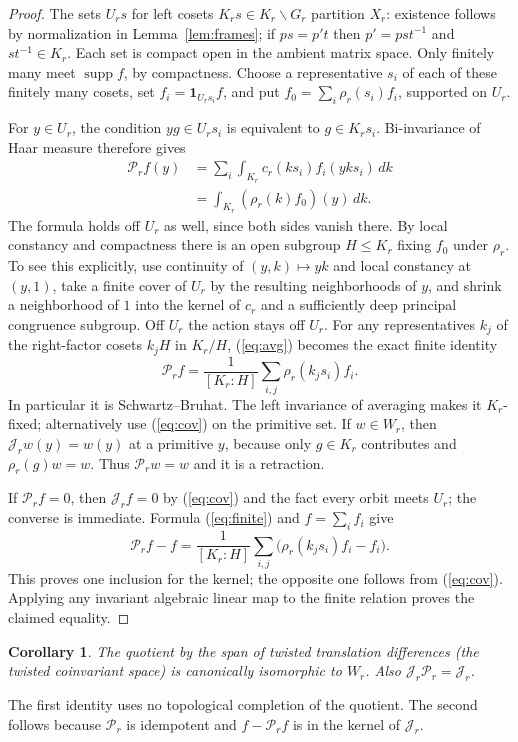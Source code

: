 \documentclass[11pt]{article}
\newtheorem{corollary}[theorem]{Corollary}
\theoremstyle{remark}\newtheorem{remark}[theorem]{Remark}
\newcommand{\Orb}{\mathcal J}
\newcommand{\Prj}{\mathcal P}
\newcommand{\one}{\mathbf 1}
\newcommand{\supp}{\operatorname{supp}}
\begin{document}
\begin{proof}
The sets $U_r s$ for left cosets $K_rs\in K_r\backslash G_r$ partition $X_r$: existence follows by normalization in Lemma~\ref{lem:frames}; if $p s=p't$ then $p'=p st^{-1}$ and $st^{-1}\in K_r$. Each set is compact open in the ambient matrix space. Only finitely many meet $\supp f$, by compactness. Choose a representative $s_i$ of each of these finitely many cosets, set $f_i=\one_{U_r s_i}f$, and put $f_0=\sum_i\rho_r(s_i)f_i$, supported on $U_r$.

For $y\in U_r$, the condition $y g\in U_r s_i$ is equivalent to $g\in K_r s_i$. Bi-invariance of Haar measure therefore gives
\begin{align}
 \Prj_r f(y)&=\sum_i\int_{K_r}c_r(ks_i)f_i(yks_i)\,dk\\
 &=\int_{K_r}(\rho_r(k)f_0)(y)\,dk.\label{eq:avg}
\end{align}
The formula holds off $U_r$ as well, since both sides vanish there. By local constancy and compactness there is an open subgroup $H\le K_r$ fixing $f_0$ under $\rho_r$. To see this explicitly, use continuity of $(y,k)\mapsto yk$ and local constancy at $(y,1)$, take a finite cover of $U_r$ by the resulting neighborhoods of $y$, and shrink a neighborhood of $1$ into the kernel of $c_r$ and a sufficiently deep principal congruence subgroup. Off $U_r$ the action stays off $U_r$. For any representatives $k_j$ of the right-factor cosets $k_jH$ in $K_r/H$, (\ref{eq:avg}) becomes the exact finite identity
\begin{equation}\label{eq:finite}
 \boxed{\displaystyle \Prj_r f=\frac{1}{[K_r:H]}
    \sum_{i,j}\rho_r(k_j s_i)f_i.}
\end{equation}
In particular it is Schwartz--Bruhat. The left invariance of averaging makes it $K_r$-fixed; alternatively use (\ref{eq:cov}) on the primitive set. If $w\in W_r$, then $\Orb_r w(y)=w(y)$ at a primitive $y$, because only $g\in K_r$ contributes and $\rho_r(g)w=w$. Thus $\Prj_r w=w$ and it is a retraction.

If $\Prj_r f=0$, then $\Orb_r f=0$ by (\ref{eq:cov}) and the fact every orbit meets $U_r$; the converse is immediate. Formula (\ref{eq:finite}) and $f=\sum_i f_i$ give
\[
 \Prj_r f-f=\frac{1}{[K_r:H]}\sum_{i,j}
     \bigl(\rho_r(k_j s_i)f_i-f_i\bigr).
\]
This proves one inclusion for the kernel; the opposite one follows from (\ref{eq:cov}). Applying any invariant algebraic linear map to the finite relation proves the claimed equality.
\end{proof}
\begin{corollary}
The quotient by the span of twisted translation differences (the twisted coinvariant space) is canonically isomorphic to $W_r$. Also $\Orb_r\Prj_r=\Orb_r$.
\end{corollary}
The first identity uses no topological completion of the quotient. The second follows because $\Prj_r$ is idempotent and $f-\Prj_r f$ is in the kernel of $\Orb_r$.
\end{document}

